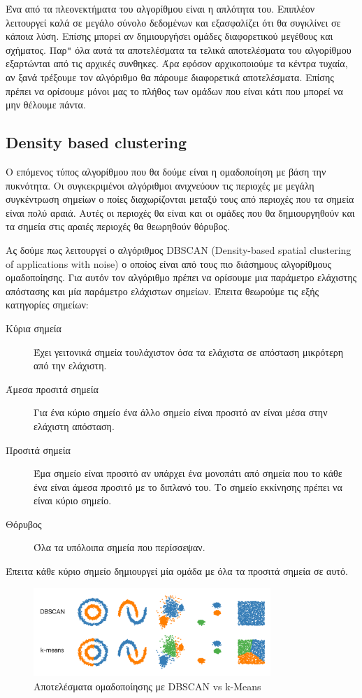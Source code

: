 Ένα από τα πλεονεκτήματα του αλγορίθμου είναι η απλότητα του. Επιπλέον λειτουργεί καλά σε μεγάλο σύνολο δεδομένων και εξασφαλίζει ότι θα συγκλίνει σε κάποια λύση. Επίσης μπορεί αν δημιουργήσει
ομάδες διαφορετικού μεγέθους και σχήματος. Παρ\texttt{"} όλα αυτά τα αποτελέσματα τα τελικά αποτελέσματα του αλγορίθμου εξαρτώνται από τις αρχικές συνθηκες. Άρα εφόσον αρχικοποιούμε τα κέντρα τυχαία, αν
ξανά τρέξουμε τον αλγόριθμο θα πάρουμε διαφορετικά αποτελέσματα. Επίσης πρέπει να ορίσουμε μόνοι μας το πλήθος των ομάδων που είναι κάτι που μπορεί να μην θέλουμε πάντα\cite{kmeans1}.
\subsection{\textlatin{Density based clustering}}
Ο επόμενος τύπος αλγορίθμου που θα δούμε είναι η ομαδοποίηση με βάση την πυκνότητα. Οι συγκεκριμένοι αλγόριθμοι ανιχνεύουν τις περιοχές με μεγάλη συγκέντρωση σημείων ο ποίες διαχωρίζονται μεταξύ
τους από περιοχές που τα σημεία είναι πολύ αραιά. Αυτές οι περιοχές θα είναι και οι ομάδες που θα δημιουργηθούν και τα σημεία στις αραιές περιοχές θα θεωρηθούν θόρυβος\cite{dbclust1}.\par Ας δούμε
πως λειτουργεί ο αλγόριθμος \textlatin{DBSCAN (Density-based spatial clustering of applications with noise)} ο οποίος είναι από τους πιο διάσημους αλγορίθμους ομαδοποίησης. Για αυτόν τον αλγόριθμο
πρέπει να ορίσουμε μια παράμετρο ελάχιστης απόστασης και μία παράμετρο ελάχιστων σημείων. Έπειτα θεωρούμε τις εξής κατηγορίες σημείων:
\begin{description}
    \item[Κύρια σημεία] Έχει γειτονικά σημεία τουλάχιστον όσα τα ελάχιστα σε απόσταση μικρότερη από την ελάχιστη.
    \item[Άμεσα προσιτά σημεία] Για ένα κύριο σημείο ένα άλλο σημείο είναι προσιτό αν είναι μέσα στην ελάχιστη απόσταση.
    \item[Προσιτά σημεία] Έμα σημείο είναι προσιτό αν υπάρχει ένα μονοπάτι από σημεία που το κάθε ένα είναι άμεσα προσιτό με το διπλανό του. Το σημείο εκκίνησης πρέπει να είναι κύριο σημείο.
    \item[Θόρυβος] Όλα τα υπόλοιπα σημεία που περίσσεψαν.
\end{description}
Έπειτα κάθε κύριο σημείο δημιουργεί μία ομάδα με όλα τα προσιτά σημεία σε αυτό\cite{dbscan}.
\begin{figure}[H]
    \centering
    \includegraphics[width=0.8\textwidth]{images/dbscan.png}
    \caption{Αποτελέσματα ομαδοποίησης με \textlatin{DBSCAN vs k-Means}}
\end{figure}
